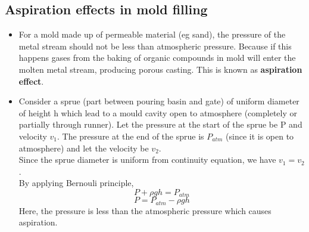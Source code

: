 \documentclass{article}
\begin{document}
	\subsection{Aspiration effects in mold filling}
	\begin{itemize}

		\item For a mold made up of permeable material (eg sand), the pressure of the metal stream should not be less than atmospheric pressure. Because if this happens gases from the baking of organic compounds in mold will enter the molten metal stream, producing porous casting. This is known as \textbf{aspiration effect}.
		\item Consider a sprue (part between pouring basin and gate) of uniform diameter of height h which lead to a mould cavity open to atmosphere (completely or partially through runner). Let the pressure at the start of the sprue be P and velocity $v_1$. The pressure at the end of the sprue is $P_{atm}$ (since it is open to atmosphere) and let the velocity be $v_2$.\\
		Since the sprue diameter is uniform from continuity equation, we have $v_1 = v_2$.\\
		By applying Bernouli principle,
		\[P + \rho g h = P_{atm}\]
		\[P = P_{atm} - \rho g h\]
		Here, the pressure is less than the atmospheric pressure which causes aspiration. 












	\end{itemize}





















	
\end{document}
